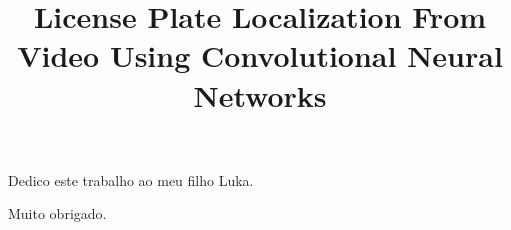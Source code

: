 \documentclass[oneside,a4paper,12pt]{normas-utf-tex}
\title{License Plate Localization From Video Using Convolutional Neural Networks}
\begin{document}
\setcounter{figure}{200}


\capa

\folhaderosto


\begin{dedicatoria}
	Dedico este trabalho ao meu filho Luka.
\end{dedicatoria}

\begin{agradecimentos}
	Muito obrigado.	
\end{agradecimentos}

\begin{resumo}
	
\end{resumo}

\begin{abstract}
	
\end{abstract}


\listadefiguras
\listadetabelas

\sumario






%
%

%
%
\end{document}
